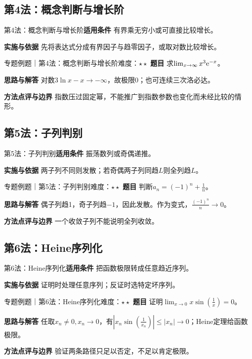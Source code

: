 \subsection{第4法：概念判断与增长阶}\label{mat:limits_35:k04}
\begin{method}{第4法：概念判断与增长阶}\textbf{适用条件} 有界乘无穷小或可直接比较增长。\par\textbf{实施与依据} 先将表达式分成有界因子与趋零因子，或取对数比较增长。\end{method}
\begin{example}{专题例题｜第4法：概念判断与增长阶}{难度：$\star\star$}
\textbf{题目} 求$\lim_{x\to\infty}x^3\mathrm{e}^{-x}$。\par\textbf{思路与解答} 对数$3\ln x-x\to-\infty$，故极限0；也可连续三次洛必达。\par\textbf{方法点评与边界} 指数压过固定幂，不能推广到指数参数也变化而未经比较的情形。
\end{example}
\subsection{第5法：子列判别}\label{mat:limits_35:k05}
\begin{method}{第5法：子列判别}\textbf{适用条件} 振荡数列或奇偶递推。\par\textbf{实施与依据} 两子列不同则发散；若奇偶两子列同趋$L$则全列趋$L$。\end{method}
\begin{example}{专题例题｜第5法：子列判别}{难度：$\star\star$}
\textbf{题目} 判断$a_n=(-1)^n+\frac{1}{n}$。\par\textbf{思路与解答} 偶子列趋1，奇子列趋$-1$，因此发散。作为变式，$\frac{(-1)^n}{n}\to0$。\par\textbf{方法点评与边界} 一个收敛子列不能说明全列收敛。
\end{example}
\subsection{第6法：Heine序列化}\label{mat:limits_35:k06}
\begin{method}{第6法：Heine序列化}\textbf{适用条件} 把函数极限转成任意趋近序列。\par\textbf{实施与依据} 证明时处理任意序列；反证时选特定坏序列。\end{method}
\begin{example}{专题例题｜第6法：Heine序列化}{难度：$\star\star$}
\textbf{题目} 证明$\lim_{x\to0}x\sin(\frac{1}{x})=0$。\par\textbf{思路与解答} 任取$x_n\ne0,x_n\to0$，有$|x_n\sin(\frac{1}{x_n})|\le|x_n|\to0$；Heine定理给函数极限。\par\textbf{方法点评与边界} 验证两条路径只足以否定，不足以肯定极限。
\end{example}
